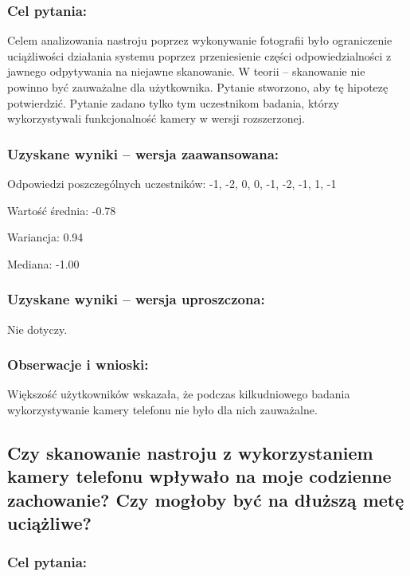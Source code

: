 	\subsubsection{Cel pytania:}
	
	Celem analizowania nastroju poprzez wykonywanie fotografii było ograniczenie uciążliwości działania systemu poprzez przeniesienie części odpowiedzialności z jawnego odpytywania na niejawne skanowanie. W teorii -- skanowanie nie powinno być zauważalne dla użytkownika. Pytanie stworzono, aby tę hipotezę potwierdzić. Pytanie zadano tylko tym uczestnikom badania, którzy wykorzystywali funkcjonalność kamery w wersji rozszerzonej.
	
	\subsubsection{Uzyskane wyniki -- wersja zaawansowana:}
	
	Odpowiedzi poszczególnych uczestników: -1, -2, 0, 0, -1, -2, -1, 1, -1
	
	Wartość średnia: -0.78
	
	Wariancja: 0.94
	
	Mediana: -1.00
	
	\subsubsection{Uzyskane wyniki -- wersja uproszczona:}
	
	Nie dotyczy.
	
	\subsubsection{Obserwacje i wnioski:}
	
	Większość użytkowników wskazała, że podczas kilkudniowego badania wykorzystywanie kamery telefonu nie było dla nich zauważalne. 
	
	
	
\subsection{Czy skanowanie nastroju z wykorzystaniem kamery telefonu wpływało na moje codzienne zachowanie? Czy mogłoby być na dłuższą metę uciążliwe?}
	
	\subsubsection{Cel pytania:}
	
